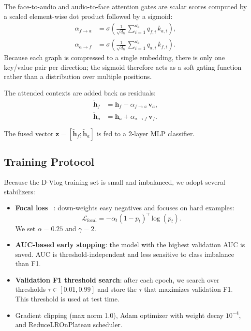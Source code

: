 \documentclass[conference]{IEEEtran}
\begin{document}
The face-to-audio and audio-to-face attention gates are scalar scores computed by a scaled element-wise dot product followed by a sigmoid:
\begin{align}
\alpha_{f\to a} &= \sigma\!\left(\frac{1}{\sqrt{d_h}} \sum_{i=1}^{d_h} q_{f,i}\,k_{a,i}\right), \\
\alpha_{a\to f} &= \sigma\!\left(\frac{1}{\sqrt{d_h}} \sum_{i=1}^{d_h} q_{a,i}\,k_{f,i}\right).
\end{align}
Because each graph is compressed to a single embedding, there is only one key/value pair per direction; the sigmoid therefore acts as a soft gating function rather than a distribution over multiple positions.

The attended contexts are added back as residuals:
\begin{align}
\tilde{\mathbf{h}}_f &= \mathbf{h}_f + \alpha_{f\to a}\,\mathbf{v}_a, \\
\tilde{\mathbf{h}}_a &= \mathbf{h}_a + \alpha_{a\to f}\,\mathbf{v}_f.
\end{align}

The fused vector $\mathbf{z}=[\tilde{\mathbf{h}}_f;\tilde{\mathbf{h}}_a]$ is fed to a 2-layer MLP classifier.

\subsection{Training Protocol}

Because the D-Vlog training set is small and imbalanced, we adopt several stabilizers:
\begin{itemize}
    \item \textbf{Focal loss}~
\cite{lin2017focal}: down-weights easy negatives and focuses on hard examples:
    \begin{equation}
    \mathcal{L}_{\text{focal}} = -\alpha_t (1-p_t)^\gamma \log(p_t).
    \end{equation}
    We set $\alpha=0.25$ and $\gamma=2$.
    \item \textbf{AUC-based early stopping}: the model with the highest validation AUC is saved.
    AUC is threshold-independent and less sensitive to class imbalance than F1.
    \item \textbf{Validation F1 threshold search}: after each epoch, we search over thresholds $\tau\in[0.01,0.99]$ and store the $\tau$ that maximizes validation F1.
    This threshold is used at test time.
    \item Gradient clipping (max norm 1.0), Adam optimizer with weight decay $10^{-4}$, and ReduceLROnPlateau scheduler.
\end{itemize}
\end{document}
